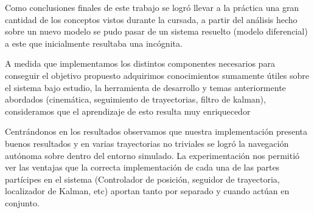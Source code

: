 

Como conclusiones finales de este trabajo se logró llevar a la práctica una gran cantidad de los conceptos vistos durante la cursada, a partir del análisis hecho sobre un nuevo modelo se pudo pasar de un sistema resuelto (modelo diferencial) a este que inicialmente resultaba una incógnita. 

A medida que implementamos los distintos componentes necesarios para conseguir el objetivo propuesto adquirimos conocimientos sumamente útiles sobre el sistema bajo estudio, la herramienta de desarrollo y temas anteriormente abordados (cinemática, seguimiento de trayectorias, filtro de kalman), consideramos que el aprendizaje de esto resulta muy enriquecedor 

Centrándonos en los resultados observamos que nuestra implementación presenta buenos resultados y en varias trayectorias no triviales se logró la navegación autónoma sobre dentro del entorno simulado. La experimentación nos permitió ver las ventajas que la correcta implementación de cada una de las partes partícipes en el sistema (Controlador de posición, seguidor de trayectoria, localizador de Kalman, etc) aportan tanto por separado y cuando actúan en conjunto.



